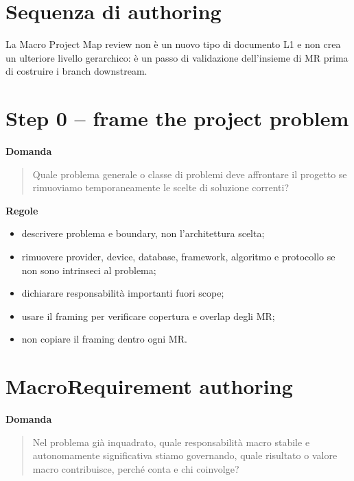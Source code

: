 \documentclass[11pt,a4paper]{article}
\begin{document}
\section{Sequenza di authoring}
\begin{center}
\end{center}
La Macro Project Map review non è un nuovo tipo di documento L1 e non crea un ulteriore livello gerarchico: è un passo di validazione dell'insieme di MR prima di costruire i branch downstream.

\section{Step 0 -- frame the project problem}
\textbf{Domanda}
\begin{quote}
Quale problema generale o classe di problemi deve affrontare il progetto se rimuoviamo temporaneamente le scelte di soluzione correnti?
\end{quote}
\textbf{Regole}
\begin{itemize}
\item descrivere problema e boundary, non l'architettura scelta;
\item rimuovere provider, device, database, framework, algoritmo e protocollo se non sono intrinseci al problema;
\item dichiarare responsabilità importanti fuori scope;
\item usare il framing per verificare copertura e overlap degli MR;
\item non copiare il framing dentro ogni MR.
\end{itemize}

\section{MacroRequirement authoring}
\textbf{Domanda}
\begin{quote}
Nel problema già inquadrato, quale responsabilità macro stabile e autonomamente significativa stiamo governando, quale risultato o valore macro contribuisce, perché conta e chi coinvolge?
\end{quote}
\end{document}

